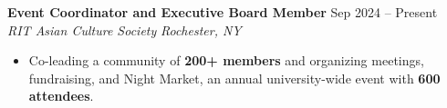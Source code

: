 \documentclass[10pt,letterpaper]{article}
\newif\ifresumeFirstRole
\newcommand{\resumeRole}[4]{%
  \ifresumeFirstRole
    \global\resumeFirstRolefalse
  \else
    \vspace{0pt plus 1fill}%
  \fi
  \textbf{#1} \hfill #2\\
  \textit{#3} \hfill \textit{#4}
}
\begin{document}
\resumeRole{Event Coordinator and Executive Board Member}{Sep 2024 -- Present}{RIT Asian Culture Society}{Rochester, NY}
\begin{itemize}
  \item Co-leading a community of \textbf{200+ members} and organizing meetings, fundraising, and Night Market, an annual university-wide event with \textbf{600 attendees}.
\end{itemize}
\end{document}

